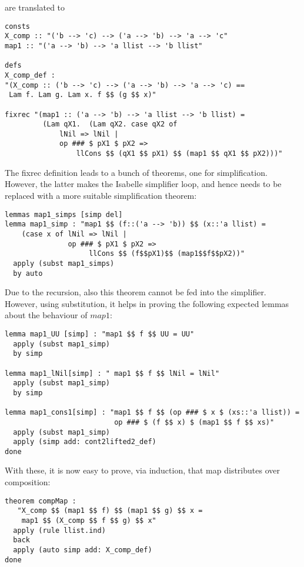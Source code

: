 \documentclass{llncs}
\begin{document}
\noindent 
are translated to

\begin{verbatim}
consts
X_comp :: "('b --> 'c) --> ('a --> 'b) --> 'a --> 'c"
map1 :: "('a --> 'b) --> 'a llist --> 'b llist"

defs
X_comp_def :
"(X_comp :: ('b --> 'c) --> ('a --> 'b) --> 'a --> 'c) ==
 Lam f. Lam g. Lam x. f $$ (g $$ x)"

fixrec "(map1 :: ('a --> 'b) --> 'a llist --> 'b llist) =
         (Lam qX1.  (Lam qX2. case qX2 of
             lNil => lNil |
             op ### $ pX1 $ pX2 =>
                 llCons $$ (qX1 $$ pX1) $$ (map1 $$ qX1 $$ pX2)))"
\end{verbatim}


\noindent 
The fixrec definition leads to a bunch of theorems, one for simplification.
However, the latter makes the Isabelle simplifier loop, and hence needs
to be replaced with a more suitable simplification theorem:
\begin{verbatim}
lemmas map1_simps [simp del]
lemma map1_simp : "map1 $$ (f::('a --> 'b)) $$ (x::'a llist) =
    (case x of lNil => lNil | 
               op ### $ pX1 $ pX2 => 
                    llCons $$ (f$$pX1)$$ (map1$$f$$pX2))"
  apply (subst map1_simps)
  by auto
\end{verbatim}

\noindent 
Due to the recursion, also this theorem cannot be fed into the simplifier.
However, using substitution, it helps in proving the following
expected lemmas about the behaviour of $map1$:

\begin{verbatim}
lemma map1_UU [simp] : "map1 $$ f $$ UU = UU"
  apply (subst map1_simp) 
  by simp

lemma map1_lNil[simp] : " map1 $$ f $$ lNil = lNil"
  apply (subst map1_simp) 
  by simp

lemma map1_cons1[simp] : "map1 $$ f $$ (op ### $ x $ (xs::'a llist)) =
                          op ### $ (f $$ x) $ (map1 $$ f $$ xs)"
  apply (subst map1_simp)
  apply (simp add: cont2lifted2_def)
done
\end{verbatim}

\noindent With these, it is now easy to prove, via induction, that map
distributes over composition:
\begin{verbatim}
theorem compMap : 
   "X_comp $$ (map1 $$ f) $$ (map1 $$ g) $$ x = 
    map1 $$ (X_comp $$ f $$ g) $$ x"
  apply (rule llist.ind)
  back
  apply (auto simp add: X_comp_def)
done
\end{verbatim}
\end{document}
